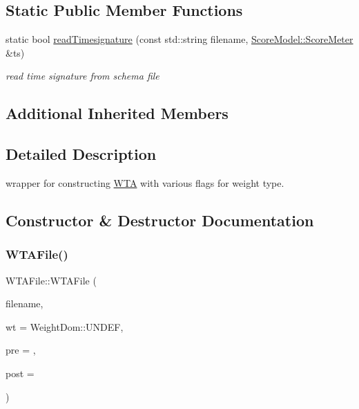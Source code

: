 \subsection*{Static Public Member Functions}
\begin{DoxyCompactItemize}
\item 
static bool \mbox{\hyperlink{classWTAFile_a1ba7fa9966d052ee8c2e7ce1b01666b3}{read\+Timesignature}} (const std\+::string filename, \mbox{\hyperlink{classScoreModel_1_1ScoreMeter}{Score\+Model\+::\+Score\+Meter}} \&ts)
\begin{DoxyCompactList}\small\item\em read time signature from schema file \end{DoxyCompactList}\end{DoxyCompactItemize}
\subsection*{Additional Inherited Members}


\subsection{Detailed Description}
wrapper for constructing \mbox{\hyperlink{classWTA}{W\+TA}} with various flags for weight type. 



\subsection{Constructor \& Destructor Documentation}
\mbox{\label{classWTAFile_a0c65f030a8df8bdb8eed5c261908e6bb}} 
\subsubsection{\texorpdfstring{WTAFile()}{WTAFile()}\hspace{0.1cm}{\footnotesize\ttfamily [1/2]}}
{\footnotesize\ttfamily W\+T\+A\+File\+::\+W\+T\+A\+File (\begin{DoxyParamCaption}\item[{const std\+::string}]{filename,  }\item[{\mbox{\hyperlink{group__general_gae07bdce6f4896785ead3b815ca6ab560}{Weight\+Dom}}}]{wt = {\ttfamily WeightDom\+:\+:UNDEF},  }\item[{\mbox{\hyperlink{group__general_ga092fe8b972dfa977c2a0886720a7731e}{pre\+\_\+t}}}]{pre = {},  }\item[{\mbox{\hyperlink{group__general_ga092fe8b972dfa977c2a0886720a7731e}{pre\+\_\+t}}}]{post = {} }\end{DoxyParamCaption})}




